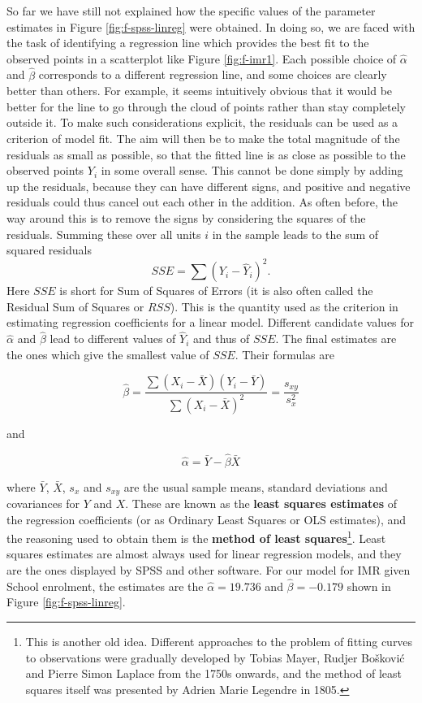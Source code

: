 \documentclass[11pt,a4paper,openany]{book}
\let\rmarkdownfootnote\footnote%
\def\footnote{\protect\rmarkdownfootnote}
\begin{document}
So far we have still not explained how the specific values of the
parameter estimates in Figure \ref{fig:f-spss-linreg} were obtained. In
doing so, we are faced with the task of identifying a regression line
which provides the best fit to the observed points in a scatterplot like
Figure \ref{fig:f-imr1}. Each possible choice of \(\hat{\alpha}\) and
\(\hat{\beta}\) corresponds to a different regression line, and some
choices are clearly better than others. For example, it seems
intuitively obvious that it would be better for the line to go through
the cloud of points rather than stay completely outside it. To make such
considerations explicit, the residuals can be used as a criterion of
model fit. The aim will then be to make the total magnitude of the
residuals as small as possible, so that the fitted line is as close as
possible to the observed points \(Y_{i}\) in some overall sense. This
cannot be done simply by adding up the residuals, because they can have
different signs, and positive and negative residuals could thus cancel
out each other in the addition. As often before, the way around this is
to remove the signs by considering the squares of the residuals. Summing
these over all units \(i\) in the sample leads to the sum of squared
residuals \[SSE = \sum (Y_{i}-\hat{Y}_{i})^{2}.\] Here \(SSE\) is short
for Sum of Squares of Errors (it is also often called the Residual Sum
of Squares or \(RSS\)). This is the quantity used as the criterion in
estimating regression coefficients for a linear model. Different
candidate values for \(\hat{\alpha}\) and \(\hat{\beta}\) lead to
different values of \(\hat{Y}_{i}\) and thus of \(SSE\). The final
estimates are the ones which give the smallest value of \(SSE\). Their
formulas are

\begin{equation}\hat{\beta}=
\frac{
\sum (X_{i}-\bar{X})(Y_{i}-\bar{Y})}
{\sum (X_{i}-\bar{X})^{2}}
=\frac{s_{xy}}{s_{x}^{2}}
\label{eq:ols-b}\end{equation}

and

\begin{equation}\hat{\alpha}=\bar{Y}-\hat{\beta}\bar{X}
\label{eq:ols-a}\end{equation}

where \(\bar{Y}\), \(\bar{X}\), \(s_{x}\) and \(s_{xy}\) are the usual
sample means, standard deviations and covariances for \(Y\) and \(X\).
These are known as the \textbf{least squares estimates} of the
regression coefficients (or as Ordinary Least Squares or OLS estimates),
and the reasoning used to obtain them is the \textbf{method of least
squares}\footnote{This is another old idea. Different approaches to the
  problem of fitting curves to observations were gradually developed by
  Tobias Mayer, Rudjer Bošković and Pierre Simon Laplace from the 1750s
  onwards, and the method of least squares itself was presented by
  Adrien Marie Legendre in 1805.}. Least squares estimates are almost
always used for linear regression models, and they are the ones
displayed by SPSS and other software. For our model for IMR given School
enrolment, the estimates are the \(\hat{\alpha}=19.736\) and
\(\hat{\beta}=-0.179\) shown in Figure \ref{fig:f-spss-linreg}.
\end{document}
